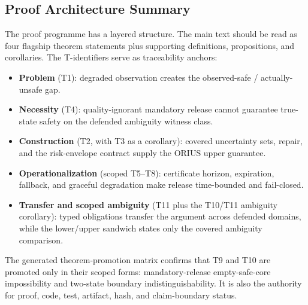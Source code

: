 \subsection{Proof Architecture Summary}

The proof programme has a layered structure.  The main text should be read as
four flagship theorem statements plus supporting definitions, propositions, and
corollaries.  The T-identifiers serve as traceability anchors:
\begin{itemize}[nosep]
  \item \textbf{Problem} (T1): degraded observation creates the observed-safe /
        actually-unsafe gap.
  \item \textbf{Necessity} (T4): quality-ignorant mandatory release cannot
        guarantee true-state safety on the defended ambiguity witness class.
  \item \textbf{Construction} (T2, with T3 as a corollary): covered uncertainty
        sets, repair, and the risk-envelope contract supply the ORIUS upper
        guarantee.
  \item \textbf{Operationalization} (scoped T5--T8): certificate horizon, expiration,
        fallback, and graceful degradation make release time-bounded and
        fail-closed.
  \item \textbf{Transfer and scoped ambiguity} (T11 plus the T10/T11 ambiguity
        corollary): typed obligations transfer the argument across defended
        domains, while the lower/upper sandwich states only the covered
        ambiguity comparison.
\end{itemize}

The generated theorem-promotion matrix confirms that T9 and T10 are promoted
only in their scoped forms: mandatory-release empty-safe-core impossibility and
two-state boundary indistinguishability.  It is also the authority for proof,
code, test, artifact, hash, and claim-boundary status.
